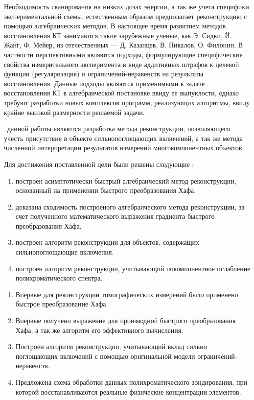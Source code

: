 Необходимость сканирования на низких дозах энергии, а так же учета специфики экспериментальной схемы, естественным образом предполагает реконструкцию с помощью алгебраических методов.
В настоящее время развитием методов восстановления КТ занимаются такие зарубежные ученые, как Э. Сидки, Й. Жанг, Ф. Мейер, из отечественных --- Д. Казанцев, В. Пикалов, О. Филонин.
В частности перспективными являются подходы, формулирующие специфические свойства измерительного эксперимента в виде аддитивных штрафов к целевой функции (регуляризация) и ограничений-неравенств на результаты восстановления.
Данные подходы являются применимыми к задаче восстановления КТ в алгебраической постановке ввиду ее выпуклости, однако требуют разработки новых комплексов программ, реализующих алгоритмы, ввиду крайне высокой размерности решаемой задачи.








{\aim} ~данной работы являются разработка метода реконструкции, позволяющего учесть присутствие в объекте сильнопоглощающих включений, а так же метода численной интерпретации результатов измерений многокомпонентных объектов.

Для достижения поставленной цели были решены следующие {\tasks}:
\begin{enumerate}
  \item построен асимптотически быстрый алгебраический метод реконструкции, основанный на применении быстрого преобразования Хафа.
  \item доказана сходимость построеного алгебраического метода реконструкции, за счет полученного математического выражения градиента быстрого преобразования Хафа.
  \item построен алгоритм реконструкции для объектов, содержащих сильнопоглощающие включения.
  \item построен алгоритм реконструкции, учитывающий покомпонентное ослабление полихроматического спектра.
\end{enumerate}

{\novelty}
\begin{enumerate}
  \item Впервые для реконструкции томографических измерений было применено быстрое преобразование Хафа.
  \item Впервые получено выражение для производной быстрого преобразования Хафа, а так же алгоритм его эффективного вычисления.
  \item Построен алгоритм реконструкции, учитывающий вклад сильно поглощающих включений с помощью оригинальной модели ограничений-неравенств.
  \item Предложена схема обработки данных полихроматического зондирования, при которой восстанавливаются реальные физические концентрации элементов.
\end{enumerate}

